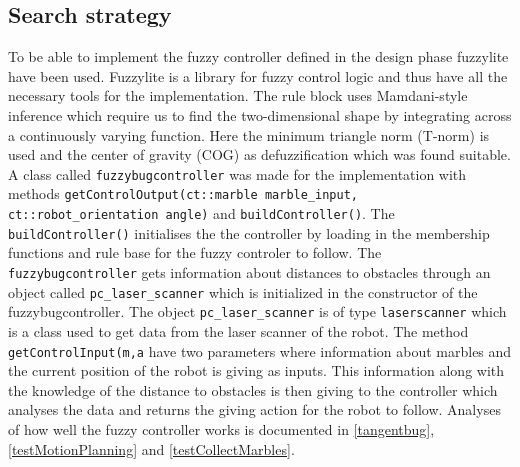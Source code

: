 \documentclass[../Head/Main.tex]{subfiles}
\begin{document}
\subsection{Search strategy}

To be able to implement the fuzzy controller defined in the design phase fuzzylite have been used. Fuzzylite is a library for fuzzy control logic and thus have all the necessary tools for the implementation. The rule block uses Mamdani-style inference which require us to find the two-dimensional shape by integrating across a continuously varying function. Here the minimum triangle norm (T-norm) is used and the center of gravity (COG) as defuzzification which was found suitable. A class called \texttt{fuzzybugcontroller} was made for the implementation with methods \texttt{getControlOutput(ct::marble marble\_input, ct::robot\_orientation angle)} and \texttt{buildController()}. The \texttt{buildController()} initialises the the controller by loading in the membership functions and rule base for the fuzzy controler to follow. The \texttt{fuzzybugcontroller} gets information about distances to obstacles through an object called \texttt{pc\_laser\_scanner} which is initialized in the constructor of the fuzzybugcontroller. The object \texttt{pc\_laser\_scanner} is of type \texttt{laserscanner} which is a class used to get data from the laser scanner of the robot. The method \texttt{getControlInput(m,a} have two parameters where information about marbles and the current position of the robot is giving as inputs. This information along with the knowledge of the distance to obstacles is then giving to the controller which analyses the data and returns the giving action for the robot to follow. Analyses of how well the fuzzy controller works is documented in \ref{tangentbug}, \ref{testMotionPlanning} and \ref{testCollectMarbles}.        	
\end{document}
